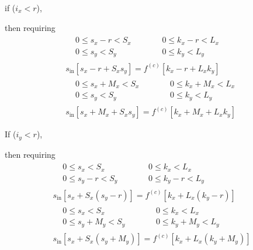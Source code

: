 \documentclass[10pt]{amsart}
\begin{document}
\begin{multicols*}{2}
if ($i_x < r$),

then requiring
\[
\begin{gathered}
  \begin{aligned}
    & 0 \leq s_x -r < S_x \\ 
    & 0 \leq s_y < S_y
  \end{aligned} \quad \quad \,
  \begin{aligned}
    & 0 \leq k_x - r < L_x \\ 
    & 0 \leq k_y < L_y
    \end{aligned} \\
  s_{\text{in}}[s_x-r + S_xs_y] = f^{(c)}[k_x-r + L_x k_y] \\ 
   \begin{aligned}
    & 0 \leq s_x +M_x < S_x \\ 
    & 0 \leq s_y < S_y
  \end{aligned} \quad \quad \,
  \begin{aligned}
    & 0 \leq k_x + M_x < L_x \\ 
    & 0 \leq k_y < L_y
  \end{aligned} \\
  s_{\text{in}}[s_x + M_x + S_xs_y] = f^{(c)}[k_x + M_x + L_xk_y]
\end{gathered}
\]

If ($i_y < r$),

then requiring
\[
\begin{gathered}
  \begin{aligned}
    & 0 \leq s_x  < S_x \\ 
    & 0 \leq s_y -r < S_y
  \end{aligned} \quad \quad \,
  \begin{aligned}
    & 0 \leq k_x  < L_x \\ 
    & 0 \leq k_y -r < L_y
    \end{aligned} \\
  s_{\text{in}}[s_x + S_x(s_y-r)] = f^{(c)}[k_x + L_x (k_y-r)] \\ 
   \begin{aligned}
    & 0 \leq s_x  < S_x \\ 
    & 0 \leq s_y +M_y < S_y
  \end{aligned} \quad \quad \,
  \begin{aligned}
    & 0 \leq k_x  < L_x \\ 
    & 0 \leq k_y +M_y< L_y
  \end{aligned} \\
  s_{\text{in}}[s_x +  S_x(s_y+M_y)] = f^{(c)}[k_x  + L_x(k_y+M_y)]
\end{gathered}
\]


\end{multicols*}
\end{document}
